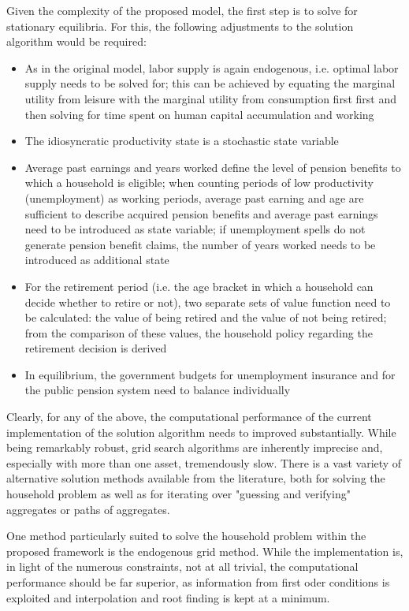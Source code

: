 Given the complexity of the proposed model, the first step is to solve for stationary equilibria. For this, the following adjustments to the solution algorithm would be required:
\begin{itemize}
    \item As in the original model, labor supply is again endogenous, i.e. optimal labor supply needs to be solved for; this can be achieved by equating the marginal utility from leisure with the marginal utility from consumption first first and then solving for time spent on human capital accumulation and working
    \item The idiosyncratic productivity state is a stochastic state variable
    \item Average past earnings and years worked define the level of pension benefits to which a household is eligible; when counting periods of low productivity (unemployment) as working periods, average past earning and age are sufficient to describe acquired pension benefits and average past earnings need to be introduced as state variable; if unemployment spells do not generate pension benefit claims, the number of years worked needs to be introduced as additional state
    \item For the retirement period (i.e. the age bracket in which a household can decide whether to retire or not), two separate sets of value function need to be calculated: the value of being retired and the value of not being retired; from the comparison of these values, the household policy regarding the retirement decision is derived
    \item In equilibrium, the government budgets for unemployment insurance and for the public pension system need to balance individually
\end{itemize}

Clearly, for any of the above, the computational performance of the current implementation of the solution algorithm needs to improved substantially. While being remarkably robust, grid search algorithms are inherently imprecise and, especially with more than one asset, tremendously slow. There is a vast variety of alternative solution methods available from the literature, both for solving the household problem as well as for iterating over "guessing and verifying" aggregates or paths of aggregates.

One method particularly suited to solve the household problem within the proposed framework is the endogenous grid method. While the implementation is, in light of the numerous constraints, not at all trivial, the computational performance should be far superior, as information from first oder conditions is exploited and interpolation and root finding is kept at a minimum.

